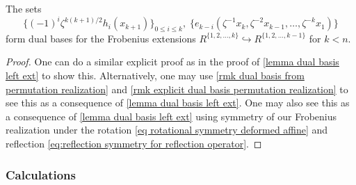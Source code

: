 \begin{corollary}\label{corollary dual basis right ext} The sets
     $$ \{(-1)^{i}\zeta^{k(k+1)/2}h_i(x_{k+1})\}_{0\leq i \leq k},\;\{e_{k-i}(\zeta^{-1} x_k, \zeta^{-2} x_{k-1}, \ldots, \zeta^{-k}x_1) \}$$ form dual bases for the Frobenius extensions $R^{\{1,2, \ldots, k\}} \hookrightarrow R^{\{1,2, \ldots, k-1\}}$ for $k<n$.
\end{corollary}
\begin{proof}
    One can do a similar explicit proof as in the proof of \cref{lemma dual basis left ext} to show this. 
    Alternatively, one may use \cref{rmk dual basis from permutation realization} and \cref{rmk explicit dual basis permutation realization} to see this as a consequence of \cref{lemma dual basis left ext}. 
    One may also see this as a consequence of \cref{lemma dual basis left ext} using symmetry of our Frobenius realization under the rotation \eqref{eq rotational symmetry deformed affine} and reflection \eqref{eq:reflection symmetry for reflection operator}.
\end{proof}




\subsubsection{Calculations}\label{subsubsec calculations}

